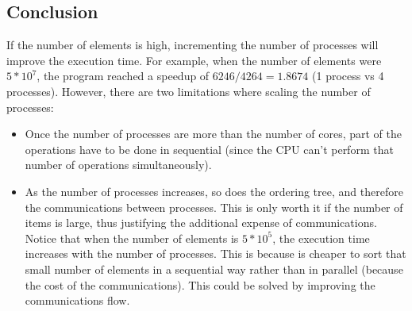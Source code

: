 \documentclass[a4paper,10pt]{article}
\begin{document}
  \subsection{Conclusion}
  If the number of elements is high, incrementing the number of processes will improve the execution time. For example, when the number of elements were $5*10^7$, the program reached 
  a speedup of $6246/4264 = 1.8674$ (1 process vs 4 processes). However, there are two limitations where scaling the number of processes:
  \begin{itemize}
  \item Once the number of processes are more than the number of cores, part of the operations have to be done in sequential (since the CPU can't perform that number of operations simultaneously).
   \item As the number of processes increases, so does the ordering tree, and therefore the communications between processes. This is only worth it if the number of items is large, thus justifying the additional expense of communications. Notice that when the number of elements is $5*10^5$, the execution time increases with the number of processes. This is because is cheaper to sort that small number of elements 
    in a sequential way rather than in parallel (because the cost of the communications). This could be solved by improving the communications flow.
   
  \end{itemize}
\end{document}
